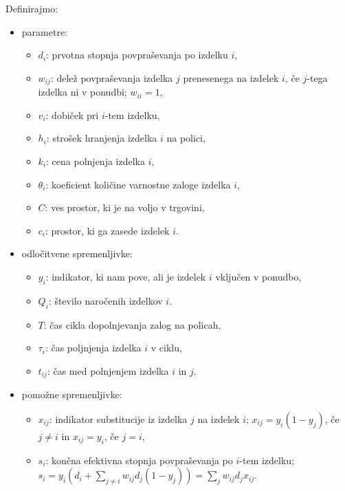\documentclass[a4paper]{article}
\begin{document}
\vspace{3 mm}
Definirajmo:
\begin{itemize}
\item parametre:
\begin{itemize}
\item $ d_i $: prvotna stopnja povpraševanja po izdelku $i$,
\item $ w_{ij}$: delež povpraševanja izdelka $j$ prenesenega na izdelek $i$, če $j$-tega izdelka ni v ponudbi; $w_{ii} = 1$,
\item $ v_i $: dobiček pri $i$-tem izdelku,
\item $ h_i $: strošek hranjenja izdelka $i$ na polici,
\item $ k_i $: cena polnjenja izdelka $i$, 
\item $ \theta_i $: koeficient količine varnostne zaloge izdelka $i$,
\item $ C $: ves prostor, ki je na voljo v trgovini,
\item $ c_i $: prostor, ki ga zasede izdelek $i$.
\end{itemize}

\item odločitvene spremenljivke:
\begin{itemize}
\item $ y_i $: indikator, ki nam pove, ali je izdelek $i$ vključen v ponudbo,
\item $ Q_i $: število naročenih izdelkov $i$.
\item $ T $: čas cikla dopolnjevanja zalog na policah,
\item $ \tau_i $: čas poljnjenja izdelka $i$ v ciklu,
\item $ t_{ij}$: čas med polnjenjem izdelka $i$ in $j$.
\end{itemize}

\item pomožne spremenljivke:
\begin{itemize}
\item $ x_{ij} $: indikator substitucije iz izdelka $j$ na izdelek $i$; $x_{ij} = y_i (1-y_j)$, če $j \ne i$ in $x_{ij} = y_i$, če  $j = i$,
\item $ s_i $: končna efektivna stopnja povpraševanja po $i$-tem izdelku; $s_i = y_i (d_i + \sum_{j \ne i} w_{ij} d_j (1-y_j)) = \sum_j  w_{ij} d_j x_{ij}.$
\end{itemize} 
\end{itemize}
\end{document}
